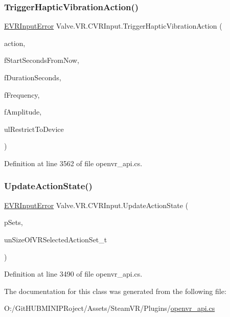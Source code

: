 \mbox{\label{class_valve_1_1_v_r_1_1_c_v_r_input_a667dfa7b1d63a185be2614b8fb772077}} 
\subsubsection{\texorpdfstring{TriggerHapticVibrationAction()}{TriggerHapticVibrationAction()}}
{\footnotesize\ttfamily \mbox{\hyperlink{namespace_valve_1_1_v_r_a592d7f4189b8346d6c96dbdbaa35bc1b}{E\+V\+R\+Input\+Error}} Valve.\+V\+R.\+C\+V\+R\+Input.\+Trigger\+Haptic\+Vibration\+Action (\begin{DoxyParamCaption}\item[{ulong}]{action,  }\item[{float}]{f\+Start\+Seconds\+From\+Now,  }\item[{float}]{f\+Duration\+Seconds,  }\item[{float}]{f\+Frequency,  }\item[{float}]{f\+Amplitude,  }\item[{ulong}]{ul\+Restrict\+To\+Device }\end{DoxyParamCaption})}



Definition at line 3562 of file openvr\+\_\+api.\+cs.

\mbox{\label{class_valve_1_1_v_r_1_1_c_v_r_input_a552cd8adc650d99f50401399ec32167c}} 
\subsubsection{\texorpdfstring{UpdateActionState()}{UpdateActionState()}}
{\footnotesize\ttfamily \mbox{\hyperlink{namespace_valve_1_1_v_r_a592d7f4189b8346d6c96dbdbaa35bc1b}{E\+V\+R\+Input\+Error}} Valve.\+V\+R.\+C\+V\+R\+Input.\+Update\+Action\+State (\begin{DoxyParamCaption}\item[{\mbox{\hyperlink{struct_valve_1_1_v_r_1_1_v_r_active_action_set__t}{V\+R\+Active\+Action\+Set\+\_\+t}} \mbox{[}$\,$\mbox{]}}]{p\+Sets,  }\item[{uint}]{un\+Size\+Of\+V\+R\+Selected\+Action\+Set\+\_\+t }\end{DoxyParamCaption})}



Definition at line 3490 of file openvr\+\_\+api.\+cs.



The documentation for this class was generated from the following file\+:\begin{DoxyCompactItemize}
\item 
O\+:/\+Git\+H\+U\+B\+M\+I\+N\+I\+P\+Roject/\+Assets/\+Steam\+V\+R/\+Plugins/\mbox{\hyperlink{openvr__api_8cs}{openvr\+\_\+api.\+cs}}\end{DoxyCompactItemize}
